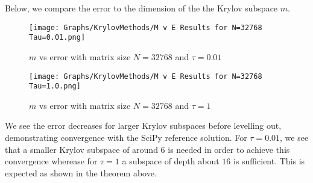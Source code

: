 Below, we compare the error to the dimension of the the Krylov subspace $m$.
\begin{figure}[H]
    \centering
    \begin{minipage}{0.49\textwidth}
        \texttt{[image: Graphs/KrylovMethods/M v E Results for N=32768 Tau=0.01.png]} %
        \caption{$m$ vs error with matrix size $N=32768$ and $\tau = 0.01$}
        \label{fig:mEKrylov1}
    \end{minipage}\hfill
    \centering
    \begin{minipage}{0.49\textwidth}
        \texttt{[image: Graphs/KrylovMethods/M v E Results for N=32768 Tau=1.0.png]} %
        \caption{$m$ vs error with matrix size $N=32768$ and $\tau = 1$}
        \label{fig:mEKrylov2}
    \end{minipage}\hfill
\end{figure}
We see the error decreases for larger Krylov subspaces before levelling out, demonstrating convergence with the SciPy reference solution.
For $\tau = 0.01$, we see that a smaller Krylov subspace of around $6$ is needed in order to achieve this convergence wherease for $\tau = 1$ a subspace of depth about $16$ is sufficient.
This is expected as shown in the theorem above.

